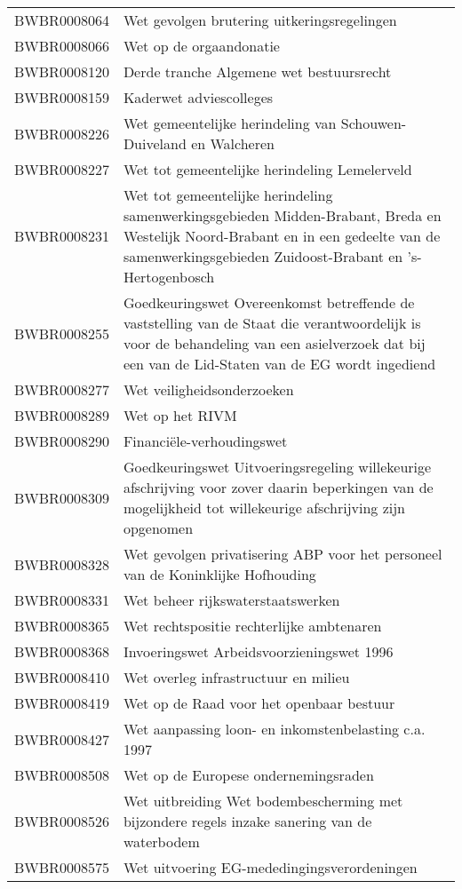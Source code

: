 \begin{longtable}{lp{}}
BWBR0008064 & Wet gevolgen brutering uitkeringsregelingen \\
BWBR0008066 & Wet op de orgaandonatie \\
BWBR0008120 & Derde tranche Algemene wet bestuursrecht \\
BWBR0008159 & Kaderwet adviescolleges \\
BWBR0008226 & Wet gemeentelijke herindeling van Schouwen-Duiveland en Walcheren \\
BWBR0008227 & Wet tot gemeentelijke herindeling Lemelerveld \\
BWBR0008231 & Wet tot gemeentelijke herindeling samenwerkingsgebieden Midden-Brabant, Breda en Westelijk Noord-Brabant en in een gedeelte van de samenwerkingsgebieden Zuidoost-Brabant en 's-Hertogenbosch \\
BWBR0008255 & Goedkeuringswet Overeenkomst betreffende de vaststelling van de Staat die verantwoordelijk is voor de behandeling van een asielverzoek dat bij een van de Lid-Staten van de EG wordt ingediend \\
BWBR0008277 & Wet veiligheidsonderzoeken \\
BWBR0008289 & Wet op het RIVM \\
BWBR0008290 & Financiële-verhoudingswet \\
BWBR0008309 & Goedkeuringswet Uitvoeringsregeling willekeurige afschrijving voor zover daarin beperkingen van de mogelijkheid tot willekeurige afschrijving zijn opgenomen \\
BWBR0008328 & Wet gevolgen privatisering ABP voor het personeel van de Koninklijke Hofhouding \\
BWBR0008331 & Wet beheer rijkswaterstaatswerken \\
BWBR0008365 & Wet rechtspositie rechterlijke ambtenaren \\
BWBR0008368 & Invoeringswet Arbeidsvoorzieningswet 1996 \\
BWBR0008410 & Wet overleg infrastructuur en milieu \\
BWBR0008419 & Wet op de Raad voor het openbaar bestuur \\
BWBR0008427 & Wet aanpassing loon- en inkomstenbelasting c.a. 1997 \\
BWBR0008508 & Wet op de Europese ondernemingsraden \\
BWBR0008526 & Wet uitbreiding Wet bodembescherming met bijzondere regels inzake sanering van de waterbodem \\
BWBR0008575 & Wet uitvoering EG-mededingingsverordeningen \\

\end{longtable}
